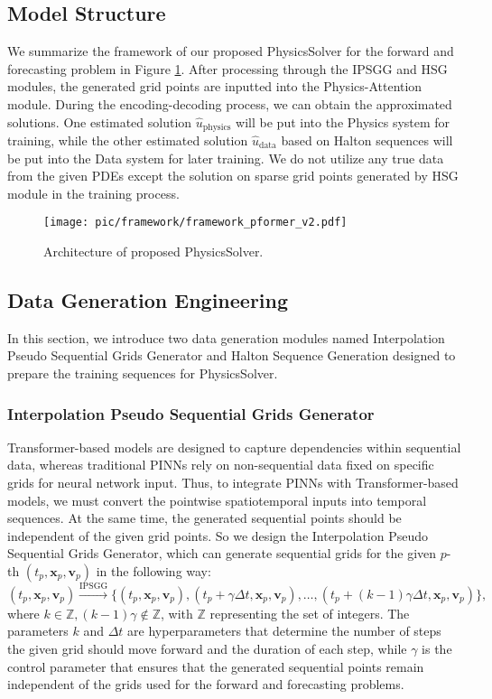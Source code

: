 \documentclass[preprint,11pt]{elsarticle}
\begin{document}
\subsection{Model Structure}
We summarize the framework of our proposed PhysicsSolver for the forward and forecasting problem in Figure \ref{fig:framework}. After processing through the IPSGG and HSG modules, the generated grid points are inputted into the Physics-Attention module. During the encoding-decoding process, we can obtain the approximated solutions. One estimated solution $\hat{u}_{\text{physics}}$ will be put into the Physics system for training, while the other estimated solution $\hat{u}_{\text{data}}$ based on Halton sequences will be put into the Data system for later training. We do not utilize any true data from the given PDEs except the solution on sparse grid points generated by HSG module in the training process.
\begin{figure}[h]
\centerline{\texttt{[image: pic/framework/framework\_pformer\_v2.pdf]}}
    \caption{Architecture of proposed PhysicsSolver.}
    \label{fig:framework}
\end{figure}
\subsection{Data Generation Engineering}
In this section, we introduce two data generation modules named Interpolation Pseudo Sequential Grids Generator and Halton Sequence Generation designed to prepare the training sequences for PhysicsSolver.
\subsubsection{Interpolation Pseudo Sequential Grids Generator} 
Transformer-based models are designed to capture dependencies within sequential data, whereas traditional PINNs rely on non-sequential data fixed on specific grids for neural network input. Thus, to integrate PINNs with Transformer-based models, we must convert the pointwise spatiotemporal inputs into temporal sequences. At the same time, the generated sequential points should be independent of the given grid points. 
So we design the Interpolation Pseudo Sequential Grids Generator, which can generate sequential grids for the given $p$-th $(t_p,\boldsymbol{x}_p,\boldsymbol{v}_p)$ in the following way:
\begin{equation} \label{IPSGG}
(t_p,\boldsymbol{x}_p,\boldsymbol{v}_p)\xrightarrow{\text{IPSGG}} \{(t_p,\boldsymbol{x}_p,\boldsymbol{v}_p), (t_p+\gamma\Delta t,\boldsymbol{x}_p,\boldsymbol{v}_p), \ldots, (t_p+(k-1)\gamma\Delta t,\boldsymbol{x}_p,\boldsymbol{v}_p)\},
\end{equation}
where $k \in \mathbb{Z}, (k-1)\gamma \not\in \mathbb{Z}$, with $\mathbb{Z}$ representing the set of integers. The parameters $k$ and $\Delta t$ are hyperparameters that determine the number of steps the given grid should move forward and the duration of each step, while $\gamma$ is the control parameter that ensures that the generated sequential points remain independent of the grids used for the forward and forecasting problems. 
\end{document}
